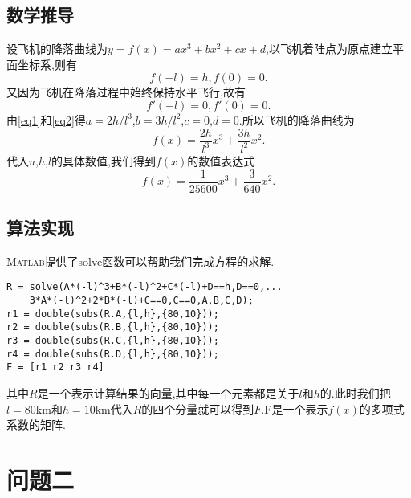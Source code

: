\documentclass[a4paper,12pt]{article}
\begin{document}
\begin{CJK*}{UTF8}{gbsn}
\subsection{数学推导}
设飞机的降落曲线为$y=f(x)=ax^3+bx^2+cx+d$,以飞机着陆点为原点建立平面坐标系,则有
\begin{equation}
f(-l)=h,f(0)=0. \label{eq1}
\end{equation}
又因为飞机在降落过程中始终保持水平飞行,故有
\begin{equation}
f'(-l)=0,f'(0)=0. \label{eq2}
\end{equation}
由\eqref{eq1}和\eqref{eq2}得$a=2h/l^3$,$b=3h/l^2$,$c=0$,$d=0$.所以飞机的降落曲线为
\begin{equation}
f(x)=\frac{2h}{l^3}x^3+\frac{3h}{l^2}x^2. \label{eq3}
\end{equation}
代入$u$,$h$,$l$的具体数值,我们得到$f(x)$的数值表达式
\begin{equation*}
f(x)=\frac{1}{25600}x^3+\frac{3}{640}x^2.
\end{equation*}


\subsection{算法实现}
\textsc{Matlab}提供了solve函数可以帮助我们完成方程的求解.
\vspace{-11pt}
\begin{lstlisting}
R = solve(A*(-l)^3+B*(-l)^2+C*(-l)+D==h,D==0,...
    3*A*(-l)^2+2*B*(-l)+C==0,C==0,A,B,C,D);
r1 = double(subs(R.A,{l,h},{80,10}));
r2 = double(subs(R.B,{l,h},{80,10}));
r3 = double(subs(R.C,{l,h},{80,10}));
r4 = double(subs(R.D,{l,h},{80,10}));
F = [r1 r2 r3 r4]
\end{lstlisting}
\vspace{7pt}
\par 其中$R$是一个表示计算结果的向量,其中每一个元素都是关于$l$和$h$的.此时我们把$l=80$km和$h=10$km代入$R$的四个分量就可以得到$F$.F是一个表示$f(x)$的多项式系数的矩阵.
\section{问题二}



\end{CJK*}
\end{document}
